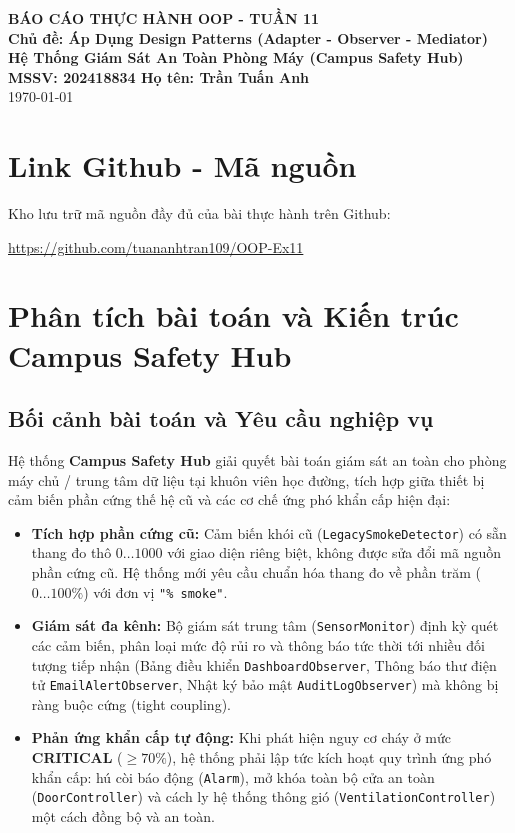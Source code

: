\documentclass[11pt,a4paper]{article}
\begin{document}
\begin{center}
    \vspace*{-0.4cm}
    {\LARGE \textbf{BÁO CÁO THỰC HÀNH OOP - TUẦN 11}}\\[0.05cm]
    {\large \textbf{Chủ đề: Áp Dụng Design Patterns (Adapter - Observer - Mediator)}}\\[0.03cm]
    {\large \textbf{Hệ Thống Giám Sát An Toàn Phòng Máy (Campus Safety Hub)}}\\[0.08cm]
    \textbf{MSSV: 202418834 \quad Họ tên: Trần Tuấn Anh}\\[0.04cm]
    \today
\end{center}

\vspace{-0.35cm}

\section{Link Github - Mã nguồn}
Kho lưu trữ mã nguồn đầy đủ của bài thực hành trên Github:
\begin{center}
    \url{https://github.com/tuananhtran109/OOP-Ex11}
\end{center}


\vspace{-0.35cm}

\section{Phân tích bài toán và Kiến trúc Campus Safety Hub}

\subsection{Bối cảnh bài toán và Yêu cầu nghiệp vụ}
Hệ thống \textbf{Campus Safety Hub} giải quyết bài toán giám sát an toàn cho phòng máy chủ / trung tâm dữ liệu tại khuôn viên học đường, tích hợp giữa thiết bị cảm biến phần cứng thế hệ cũ và các cơ chế ứng phó khẩn cấp hiện đại:
\begin{itemize}[itemsep=1.0pt]
    \item \textbf{Tích hợp phần cứng cũ:} Cảm biến khói cũ (\texttt{LegacySmokeDetector}) có sẵn thang đo thô $0 \dots 1000$ với giao diện riêng biệt, không được sửa đổi mã nguồn phần cứng cũ. Hệ thống mới yêu cầu chuẩn hóa thang đo về phần trăm ($0 \dots 100\%$) với đơn vị \texttt{"\% smoke"}.
    \item \textbf{Giám sát đa kênh:} Bộ giám sát trung tâm (\texttt{SensorMonitor}) định kỳ quét các cảm biến, phân loại mức độ rủi ro và thông báo tức thời tới nhiều đối tượng tiếp nhận (Bảng điều khiển \texttt{DashboardObserver}, Thông báo thư điện tử \texttt{EmailAlertObserver}, Nhật ký bảo mật \texttt{AuditLogObserver}) mà không bị ràng buộc cứng (tight coupling).
    \item \textbf{Phản ứng khẩn cấp tự động:} Khi phát hiện nguy cơ cháy ở mức \textbf{CRITICAL} ($\ge 70\%$), hệ thống phải lập tức kích hoạt quy trình ứng phó khẩn cấp: hú còi báo động (\texttt{Alarm}), mở khóa toàn bộ cửa an toàn (\texttt{DoorController}) và cách ly hệ thống thông gió (\texttt{VentilationController}) một cách đồng bộ và an toàn.
\end{itemize}
\end{document}
